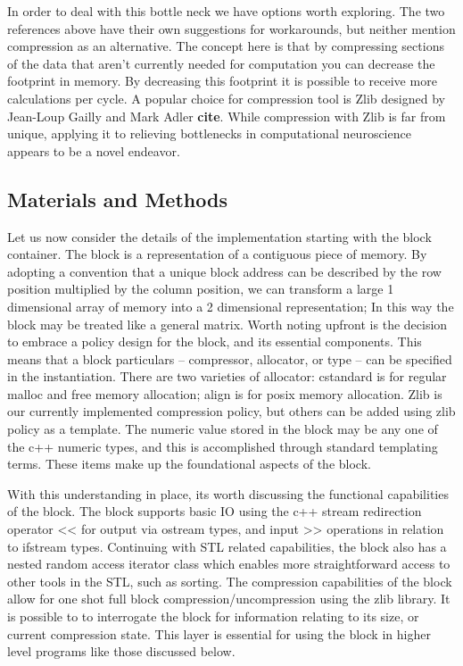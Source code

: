 In order to deal with this bottle neck we have options worth exploring.
The two references above have their own suggestions for workarounds, but
neither mention compression as an alternative. The concept here is that
by compressing sections of the data that aren't currently needed for
computation you can decrease the footprint in memory. By decreasing this
footprint it is possible to receive more calculations per cycle. A
popular choice for compression tool is Zlib designed by Jean-Loup Gailly
and Mark Adler \textbf{cite}. While compression with Zlib is far from
unique, applying it to relieving bottlenecks in computational
neuroscience appears to be a novel endeavor.

\subsection{Materials and Methods}\label{materials-and-methods}

Let us now consider the details of the implementation starting with the
block container. The block is a representation of a contiguous piece of
memory. By adopting a convention that a unique block address can be
described by the row position multiplied by the column position, we can
transform a large 1 dimensional array of memory into a 2 dimensional
representation; In this way the block may be treated like a general
matrix. Worth noting upfront is the decision to embrace a policy design
for the block, and its essential components. This means that a block
particulars -- compressor, allocator, or type -- can be specified in the
instantiation. There are two varieties of allocator: cstandard is for
regular malloc and free memory allocation; align is for posix memory
allocation. Zlib is our currently implemented compression policy, but
others can be added using zlib policy as a template. The numeric value
stored in the block may be any one of the c++ numeric types, and this is
accomplished through standard templating terms. These items make up the
foundational aspects of the block.

With this understanding in place, its worth discussing the functional
capabilities of the block. The block supports basic IO using the c++
stream redirection operator \textless{}\textless{} for output via
ostream types, and input \textgreater{}\textgreater{} operations in
relation to ifstream types. Continuing with STL related capabilities,
the block also has a nested random access iterator class which enables
more straightforward access to other tools in the STL, such as sorting.
The compression capabilities of the block allow for one shot full block
compression/uncompression using the zlib library. It is possible to to
interrogate the block for information relating to its size, or current
compression state. This layer is essential for using the block in higher
level programs like those discussed below.

